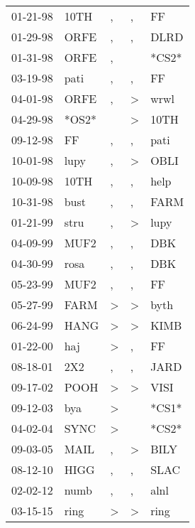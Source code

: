 \begin{supertabular}{lllll}
 01-21-98 &   10TH &             , &             , &     FF \\
 01-29-98 &   ORFE &             , &             , &   DLRD \\
 01-31-98 &   ORFE &             , &               &  *CS2* \\
 03-19-98 &   pati &             , &             , &     FF \\
 04-01-98 &   ORFE &             , &  \textgreater &   wrwl \\
 04-29-98 &  *OS2* &               &  \textgreater &   10TH \\
 09-12-98 &     FF &             , &             , &   pati \\
 10-01-98 &   lupy &             , &  \textgreater &   OBLI \\
 10-09-98 &   10TH &             , &             , &   help \\
 10-31-98 &   bust &             , &             , &   FARM \\
 01-21-99 &   stru &             , &  \textgreater &   lupy \\
 04-09-99 &   MUF2 &             , &             , &    DBK \\
 04-30-99 &   rosa &             , &             , &    DBK \\
 05-23-99 &   MUF2 &             , &             , &     FF \\
 05-27-99 &   FARM &  \textgreater &  \textgreater &   byth \\
 06-24-99 &   HANG &  \textgreater &  \textgreater &   KIMB \\
 01-22-00 &    haj &  \textgreater &             , &     FF \\
 08-18-01 &    2X2 &             , &             , &   JARD \\
 09-17-02 &   POOH &  \textgreater &  \textgreater &   VISI \\
 09-12-03 &    bya &  \textgreater &               &  *CS1* \\
 04-02-04 &   SYNC &  \textgreater &               &  *CS2* \\
 09-03-05 &   MAIL &             , &  \textgreater &   BILY \\
 08-12-10 &   HIGG &             , &             , &   SLAC \\
 02-02-12 &   numb &             , &             , &   alnl \\
 03-15-15 &   ring &  \textgreater &  \textgreater &   ring \\
\end{supertabular}
